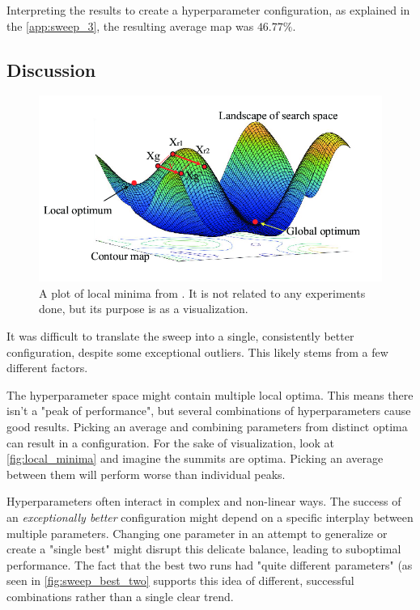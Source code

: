 Interpreting the results to create a hyperparameter configuration, as explained in the \autoref{app:sweep_3}, the resulting average \acrshort{map} was \(46.77\%\). 

\subsection{Discussion}
\label{ssec:ex4_discussion}


\begin{figure}
    \centering
    \includegraphics[width=0.75\linewidth]{figures/local_minima.png}
    \caption{A plot of local minima from \cite{fig:multiple_local_minima}. It is not related to any experiments done, but its purpose is as a visualization.}
    \label{fig:local_minima}
\end{figure}

It was difficult to translate the sweep into a single, consistently better configuration, despite some exceptional outliers. This likely stems from a few different factors. 

The hyperparameter space might contain multiple local optima. This means there isn't a "peak of performance", but several combinations of hyperparameters cause good results. Picking an average and combining parameters from distinct optima can result in a configuration. For the sake of visualization, look at \autoref{fig:local_minima} and imagine the summits are optima. Picking an average between them will perform worse than individual peaks. 

Hyperparameters often interact in complex and non-linear ways. The success of an \emph{exceptionally better} configuration might depend on a specific interplay between multiple parameters. Changing one parameter in an attempt to generalize or create a "single best" might disrupt this delicate balance, leading to suboptimal performance. The fact that the best two runs had "quite different parameters" (as seen in \autoref{fig:sweep_best_two} supports this idea of different, successful combinations rather than a single clear trend.


